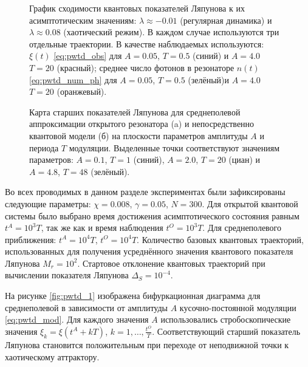 \begin{figure}[ht]
	\caption[График сходимости квантовых показателей Ляпунова к их асимптотическим значениям для разных наблюдаемых в модели открытого резонатора]{
		График сходимости квантовых показателей Ляпунова к их асимптотическим значениям: $\lambda \approx -0.01$ (регулярная динамика) и $\lambda \approx 0.08$ (хаотический режим). В каждом случае используются три отдельные траектории.
		В качестве наблюдаемых используются: $\xi(t)$ \cref{eq:pwtd_obs} для $A = 0.05$, $T = 0.5$ (синий) и $A = 4.0$ $T = 20$ (красный); среднее число фотонов в резонаторе $n(t)$ \cref{eq:pwtd_num_ph} для $A = 0.05$, $T = 0.5$ (зелёный)и $A = 4.0$ $T = 20$ (оранжевый).
	}
	\label{fig:pwtd_3}
\end{figure}

\begin{figure}[h]
	\legend{}
	\caption[Карта старших показателей Ляпунова для открытого резонатора и его среднеполевой аппроксимации на плоскости параметров амплитуды и периода модуляции]
	{
		Карта старших показателей Ляпунова для среднеполевой аппроксимации открытого резонатора (a) и непосредственно квантовой модели (б) на плоскости параметров амплитуды $A$ и периода $T$ модуляции. Выделенные точки соответствуют значениям параметров: $A = 0.1$, $T = 1$ (синий), $A = 2.0$, $T = 20$ (циан) и $A = 4.8$, $T = 48$ (зелёный).
	}
	\label{fig:pwtd_4}
\end{figure}

Во всех проводимых в данном разделе экспериментах были зафиксированы следующие параметры: $\chi=0.008$, $\gamma=0.05$, $N=300$. Для открытой квантовой системы было выбрано время достижения асимптотического состояния равным \(t^A = 10^3T\), так же как и время наблюдения \(t^O = 10^3T\). Для среднеполевого приближения: \(t^A = 10^4T\), \(t^O = 10^4T\). Количество базовых квантовых траекторий, использованных для получения усреднённого значения квантового показателя Ляпунова $M_r=10^2$. Стартовое отклонение квантовых траекторий при вычислении показателя Ляпунова $\Delta_S = 10^{-4}$.

На рисунке \cref{fig:pwtd_1} изображена бифуркационная диаграмма для среднеполевой в зависимости от амплитуды $A$ кусочно-постоянной модуляции \cref{eq:pwtd_mod}. Для каждого значения $A$ использовались стробоскопические значения $\xi_k = \xi(t^A + k T)$, $k=1,\ldots,\frac{t^O}{T}$. Соответствующий старший показатель Ляпунова становится положительным при переходе от неподвижной точки к хаотическому аттрактору.

